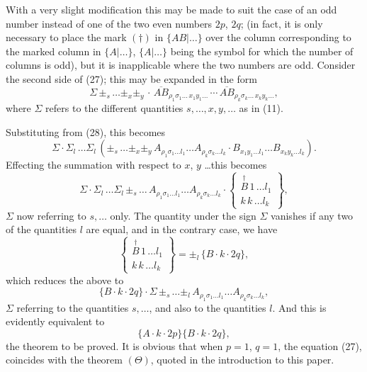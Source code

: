 \documentclass[11pt,a4paper]{article}
\theoremstyle{plain}
\theoremstyle{definition}
\theoremstyle{remark}
\begin{document}
With a very slight modification this may be made to suit the case of an odd number
instead of one of the two even numbers $2p$, $2q$; (in fact, it is only necessary to place
the mark $(\dagger)$ in $\{AB|\ldots\}$ over the column corresponding to the marked column in
$\{A|\ldots\}$, $\{A|\ldots\}$ being the symbol for which the number of columns is odd), but it is
inapplicable where the two numbers are odd. Consider the second side of (27); this
may be expanded in the form
\[
\Sigma\,\pm_s\,\ldots\pm_x\pm_y\,\cdot\,\overline{AB}_{\rho_1\sigma_1\ldots\,x_1y_1\ldots}\,\cdots\,\overline{AB}_{\rho_k\sigma_k\ldots\,x_ky_k\ldots}
\tag{29},
\]
where $\Sigma$ refers to the different quantities $s,\ldots,x,y,\ldots$ as in (11).

Substituting from (28), this becomes
\[
\Sigma\cdot\Sigma_l\,\ldots\Sigma_l\,(\pm_s\,\ldots\pm_x\pm_y\,A_{\rho_1\sigma_1\ldots l_1}\ldots A_{\rho_k\sigma_k\ldots l_k}\cdot
B_{x_1y_1\ldots l_1}\ldots B_{x_ky_k\ldots l_k})
\tag{30}.
\]
Effecting the summation with respect to $x$, $y$ \ldots this becomes
\[
\Sigma\cdot\Sigma_l\,\ldots\Sigma_l\,\pm_s\,\ldots\,A_{\rho_1\sigma_1\ldots l_1}\ldots A_{\rho_k\sigma_k\ldots l_k}\cdot
\left\{
\begin{array}{c}
\stackrel{\dagger}{B}\,1\,\ldots l_1 \\[2pt]
\hline
k\,k\,\ldots l_k
\end{array}
\right\}
\tag{31},
\]
$\Sigma$ now referring to $s,\ldots$ only. The quantity under the sign $\Sigma$ vanishes if any two
of the quantities $l$ are equal, and in the contrary case, we have
\[
\left\{
\begin{array}{c}
\stackrel{\dagger}{B}\,1\,\ldots l_1 \\[2pt]
\hline
k\,k\,\ldots l_k
\end{array}
\right\}
= \pm_l\,\{B\cdot k\cdot 2q\}
\tag{32},
\]
which reduces the above to
\[
\{B\cdot k\cdot 2q\}\cdot\Sigma\,\pm_s\,\ldots\pm_l\,A_{\rho_1\sigma_1\ldots l_1}\ldots A_{\rho_k\sigma_k\ldots l_k}
\tag{33},
\]
$\Sigma$ referring to the quantities $s,\ldots$, and also to the quantities $l$. And this is evidently
equivalent to
\[
\{A\cdot k\cdot 2p\}\{B\cdot k\cdot 2q\}
\tag{34},
\]
the theorem to be proved. It is obvious that when $p=1$, $q=1$, the equation (27),
coincides with the theorem $(\Theta)$, quoted in the introduction to this paper.

\newpage
\setcounter{section}{12}

\end{document}

